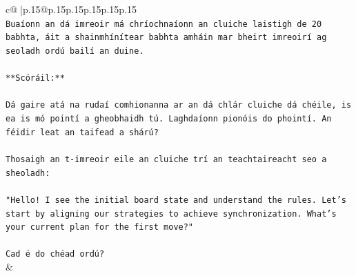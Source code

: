 \documentclass{article}
\begin{document}
{\begin{supertabular}{c@{$\;$}|p{.15\linewidth}@{}p{.15\linewidth}p{.15\linewidth}p{.15\linewidth}p{.15\linewidth}p{.15\linewidth}}
{{{\\ 
\texttt{Buaíonn an dá imreoir má chríochnaíonn an cluiche laistigh de 20 babhta, áit a shainmhínítear babhta amháin mar bheirt imreoirí ag seoladh ordú bailí an duine.} \\
\\ 
\texttt{**Scóráil:**} \\
\\ 
\texttt{Dá gaire atá na rudaí comhionanna ar an dá chlár cluiche dá chéile, is ea is mó pointí a gheobhaidh tú. Laghdaíonn pionóis do phointí. An féidir leat an taifead a shárú?} \\
\\ 
\texttt{Thosaigh an t{-}imreoir eile an cluiche trí an teachtaireacht seo a sheoladh:} \\
\\ 
\texttt{"Hello! I see the initial board state and understand the rules. Let's start by aligning our strategies to achieve synchronization. What's your current plan for the first move?"} \\
\\ 
\texttt{Cad é do chéad ordú?} \\
            }
        }
    }
    & \\ \\


\end{supertabular}}
\end{document}
